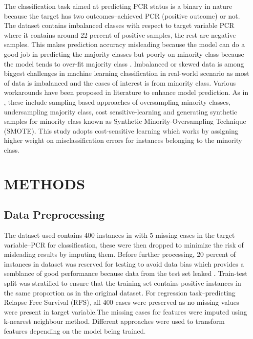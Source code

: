 \documentclass{article}
\begin{document}
The classification task aimed at predicting PCR status is a binary in nature  because the target has two outcomes--achieved PCR (positive outcome) or not. The dataset contains imbalanced classes with respect to target variable PCR where it contains around 22 percent of positive samples, the rest are negative samples. This makes prediction accuracy misleading because the model can do a good job in predicting the majority classes but poorly on minority class because the model tends to  over-fit majority class \cite{spelmen2018review,pristyanto2018}. Imbalanced or skewed data is among biggest challenges in machine learning classification in real-world scenario as most of data is imbalanced and the cases of interest is from minority class. Various workarounds have been proposed in literature to enhance model prediction. As in \cite{spelmen2018review,sukhanov2015}, these include sampling based approaches  of oversampling minority classes, undersampling majority class, cost sensitive-learning and generating synthetic samples for minority class known as Synthetic Minority-Oversampling Technique (SMOTE). This study adopts cost-sensitive learning which works by assigning higher weight on misclassification errors for instances belonging to the minority class.  



\section{METHODS}
\label{sec:methods}
\subsection{Data Preprocessing}
The dataset used contains 400 instances in with 5 missing cases in the target variable--PCR for classification, these were then dropped to minimize the risk of misleading results by imputing them. Before further processing, 20 percent of instances in dataset was reserved for testing to  avoid data bias which provides a semblance of good performance because data from the test set leaked \cite{geron2022hands}. Train-test split was stratified to ensure that the training set contains positive instances in the same proportion as in the original dataset. For regression task--predicting Relapse Free Survival (RFS), all 400 cases were preserved as no missing values were present in target variable.The missing cases for features were imputed using k-nearest neighbour method. Different approaches were used to transform features depending on the model being trained. 
\end{document}
